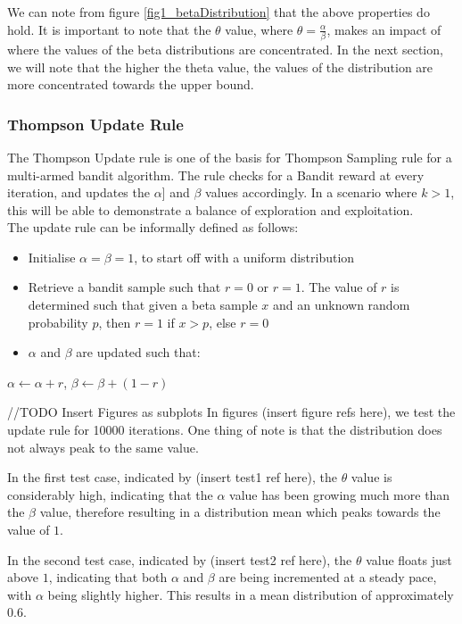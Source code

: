 \documentclass{article}
\begin{document}
We can note from figure \ref{fig1_betaDistribution} that the above properties do hold. It is important to note that the $\theta$ value, where $\theta = \frac{\alpha}{\beta}$, makes an impact of where the values of the beta distributions are concentrated. In the next section, we will note that the higher the theta value, the values of the distribution are more concentrated towards the upper bound.

\subsubsection{Thompson Update Rule}
The Thompson Update rule is one of the basis for Thompson Sampling rule for a multi-armed bandit algorithm. The rule checks for a Bandit reward at every iteration, and updates the $\alpha]$ and $\beta$ values accordingly. In a scenario where $k > 1$, this will be able to demonstrate a balance of exploration and exploitation. \\ The update rule can be informally defined as follows:

\begin{itemize}
	\item Initialise $\alpha = \beta = 1$, to start off with a uniform distribution
	\item Retrieve a bandit sample such that $r = 0$ or $r = 1$. The value of $r$ is determined such that given a beta sample $x$ and an unknown random probability $p$, then $r = 1$ if $x > p$, else $r = 0$
	\item$\alpha$ and $\beta$ are updated such that:
\end{itemize}
\begin{center}
	$\alpha \leftarrow \alpha + r$, $\beta \leftarrow \beta + (1-r)$
\end{center}
//TODO Insert Figures as subplots
In figures (insert figure refs here), we test the update rule for 10000 iterations. One thing of note is that the distribution does not always peak to the same value. 

In the first test case, indicated by (insert test1 ref here), the $\theta$ value is considerably high, indicating that the $\alpha$ value has been growing much more than the $\beta$ value, therefore resulting in a distribution mean which peaks towards the value of $1$.

In the second test case, indicated by (insert test2 ref here), the $\theta$ value floats just above $1$, indicating that both $\alpha$ and $\beta$ are being incremented at a steady pace, with $\alpha$ being slightly higher. This results in a mean distribution of approximately $0.6$.
\end{document}
